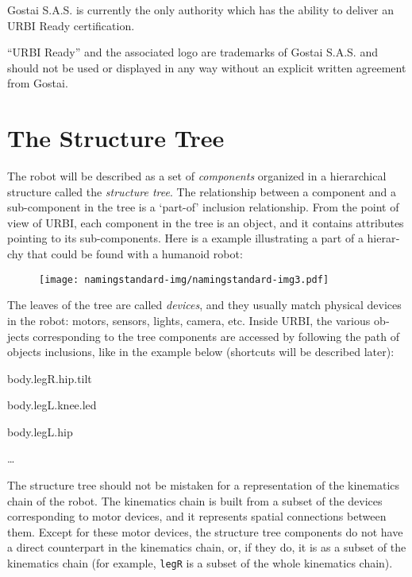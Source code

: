 \documentclass[a4paper]{article}
\begin{document}
{\sffamily
Gostai S.A.S. is currently the only authority which has the ability to
deliver an {\textquotedbl}URBI Ready{\textquotedbl} certification.}

{
“URBI Ready” and the associated logo are trademarks of Gostai S.A.S. and
should not be used or displayed in any way without an explicit written
agreement from Gostai.}

\section[The Structure Tree]{ The Structure
Tree}
{
\foreignlanguage{english}{\textsf{The robot will be described as a set
of
}}\foreignlanguage{english}{\textsf{\textit{components}}}\foreignlanguage{english}{\textsf{
organized in a hierarchical structure called the
}}\foreignlanguage{english}{\textsf{\textit{structure
tree}}}\foreignlanguage{english}{\textsf{. The relationship between a
component and a sub-component in the tree is a ‘part-of’ inclusion
relationship. From the point of view of URBI, each component in the
tree is an object, and it contains attributes pointing to its
sub-components. Here is a example illustrating a part of a hierarchy
that could be found with a humanoid robot:}}}



\begin{figure}
\centering
\texttt{[image: namingstandard-img/namingstandard-img3.pdf]}
\end{figure}
{
\foreignlanguage{english}{\textsf{The leaves of the tree are called
}}\foreignlanguage{english}{\textsf{\textit{devices}}}\foreignlanguage{english}{\textsf{,
and they usually match physical devices in the robot: motors, sensors,
lights, camera, etc. Inside URBI, the various objects corresponding to
the tree components are accessed by following the path of objects
inclusions, like in the example below (shortcuts will be described
later):}}}

{
body.legR.hip.tilt}

{
body.legL.knee.led}

{
body.legL.hip}

{
…}

{\sffamily
The structure tree should not be mistaken for a representation of the
kinematics chain of the robot. The kinematics chain is built from a
subset of the devices corresponding to motor devices, and it represents
spatial connections between them. Except for these motor devices, the
structure tree components do not have a direct counterpart in the
kinematics chain, or, if they do, it is as a subset of the kinematics
chain (for example, \texttt{legR} is a subset of the whole kinematics
chain).}
\end{document}
